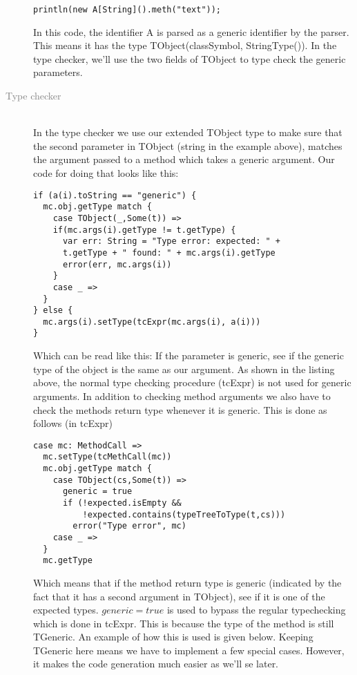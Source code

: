 \begin{description}
\begin{lstlisting}
println(new A[String]().meth("text"));
\end{lstlisting}

In this code, the identifier A is parsed as a generic identifier by the parser. This means it has the type TObject(classSymbol, StringType()). In the type checker, we'll use the two fields of TObject to type check the generic parameters.

\item[\textcolor{Gray}{Type checker}] \hfill \\
In the type checker we use our extended TObject type to make sure that the second parameter in TObject (string in the example above), matches the argument passed to a method which takes a generic argument. Our code for doing that looks like this:

\begin{lstlisting}
if (a(i).toString == "generic") {
  mc.obj.getType match {
    case TObject(_,Some(t)) =>
    if(mc.args(i).getType != t.getType) {
      var err: String = "Type error: expected: " +
      t.getType + " found: " + mc.args(i).getType
      error(err, mc.args(i))
    }
    case _ =>
  }
} else {
  mc.args(i).setType(tcExpr(mc.args(i), a(i)))
}
\end{lstlisting}

Which can be read like this: If the parameter is generic, see if the generic type of the object is the same as our argument. As shown in the listing above, the normal type checking procedure (tcExpr) is not used for generic arguments. In addition to checking method arguments we also have to check the methods return type whenever it is generic. This is done as follows (in tcExpr)

\begin{lstlisting}
case mc: MethodCall =>
  mc.setType(tcMethCall(mc))
  mc.obj.getType match {
    case TObject(cs,Some(t)) =>
      generic = true
      if (!expected.isEmpty &&
          !expected.contains(typeTreeToType(t,cs)))
        error("Type error", mc)
    case _ =>
  }
  mc.getType
\end{lstlisting}

Which means that if the method return type is generic (indicated by the fact that it has a second argument in TObject), see if it is one of the expected types. $generic = true$ is used to bypass the regular typechecking which is done in tcExpr. This is because the type of the method is still TGeneric. An example of how this is used is given below. Keeping TGeneric here means we have to implement a few special cases. However, it makes the code generation much easier as we'll se later.


\end{description}
